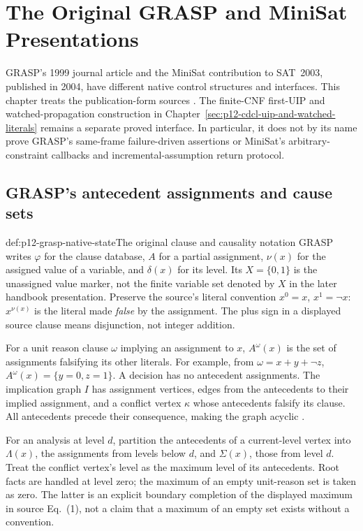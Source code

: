\chapter{The Original GRASP and MiniSat Presentations}
\label{sec:p12-grasp-and-minisat-originals}

GRASP's 1999 journal article and the MiniSat contribution to SAT~2003,
published in 2004, have different native control structures and interfaces.
This chapter treats the publication-form sources
\cite{MarquesSilvaSakallah1999,EenSorensson2003}.
The finite-CNF first-UIP and watched-propagation construction in
Chapter~\ref{sec:p12-cdcl-uip-and-watched-literals} remains a separate proved
interface.  In particular, it does not by its name prove GRASP's same-frame
failure-driven assertions or MiniSat's arbitrary-constraint callbacks and
incremental-assumption return protocol.

\section{GRASP's antecedent assignments and cause sets}

\begin{hbdefinition}{def:p12-grasp-native-state}{The original clause and causality notation}
GRASP writes \(\varphi\) for the clause database, \(A\) for a partial
assignment, \(\nu(x)\) for the assigned value of a variable, and
\(\delta(x)\) for its level.  Its \(X=\{0,1\}\) is the unassigned
value marker, not the finite variable set denoted by \(X\) in the later
handbook presentation.  Preserve the source's literal convention
\(x^0=x\), \(x^1=\neg x\): \(x^{\nu(x)}\) is the literal made
\emph{false} by the assignment.  The plus sign in a displayed source clause
means disjunction, not integer addition.

For a unit reason clause \(\omega\) implying an assignment to \(x\),
\(A^\omega(x)\) is the set of assignments falsifying its other literals.
For example, from \(\omega=x+y+\neg z\),
\(A^\omega(x)=\{y=0,z=1\}\).  A decision has no antecedent assignments.
The implication graph \(I\) has assignment vertices, edges from the
antecedents to their implied assignment, and a conflict vertex \(\kappa\)
whose antecedents falsify its clause.  All antecedents precede their
consequence, making the graph acyclic
\cite[Secs.~2.1, 2.4; Fig.~1]{MarquesSilvaSakallah1999}.

For an analysis at level \(d\), partition the antecedents of a current-level
vertex into \(\Lambda(x)\), the assignments from levels below \(d\), and
\(\Sigma(x)\), those from level \(d\).  Treat the conflict vertex's level
as the maximum level of its antecedents.  Root facts are handled at level zero;
the maximum of an empty unit-reason set is taken as zero.  The latter is an
explicit boundary completion of the displayed maximum in source Eq.~(1),
not a claim that a maximum of an empty set exists without a convention.
\end{hbdefinition}

